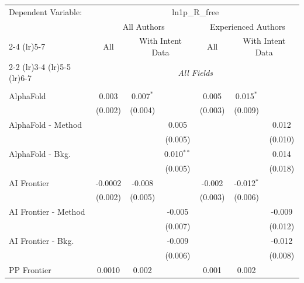 \begingroup
\centering
\begin{tabular}{lcccccc}
   \tabularnewline \midrule \midrule
   Dependent Variable: & \multicolumn{6}{c}{ln1p\_R\_free}\\
 & \multicolumn{3}{c}{All Authors} & \multicolumn{3}{c}{Experienced Authors} \\
\cmidrule(lr){2-4} \cmidrule(lr){5-7}
 & \multicolumn{1}{c}{All} & \multicolumn{2}{c}{With Intent Data} & \multicolumn{1}{c}{All} & \multicolumn{2}{c}{With Intent Data} \\
\cmidrule(lr){2-2} \cmidrule(lr){3-4} \cmidrule(lr){5-5} \cmidrule(lr){6-7}
 & \multicolumn{6}{c}{\textit{All Fields}} \\ \\
   AlphaFold            & 0.003        & 0.007$^{*}$ &              & 0.005       & 0.015$^{*}$  &   \\   
                        & (0.002)      & (0.004)     &              & (0.003)     & (0.009)      &   \\   
   AlphaFold - Method   &              &             & 0.005        &             &              & 0.012\\   
                        &              &             & (0.005)      &             &              & (0.010)\\   
   AlphaFold - Bkg.     &              &             & 0.010$^{**}$ &             &              & 0.014\\   
                        &              &             & (0.005)      &             &              & (0.018)\\   
   AI Frontier          & -0.0002      & -0.008      &              & -0.002      & -0.012$^{*}$ &   \\   
                        & (0.002)      & (0.005)     &              & (0.003)     & (0.006)      &   \\   
   AI Frontier - Method &              &             & -0.005       &             &              & -0.009\\   
                        &              &             & (0.007)      &             &              & (0.012)\\   
   AI Frontier - Bkg.   &              &             & -0.009       &             &              & -0.012\\   
                        &              &             & (0.006)      &             &              & (0.008)\\   
   PP Frontier          & 0.0010       & 0.002       &              & 0.001       & 0.002        &   \\   

\end{tabular}
